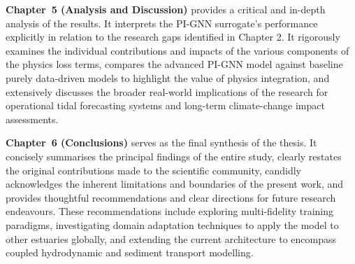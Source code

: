 \textbf{Chapter~5 (Analysis and Discussion)} provides a critical and in-depth analysis of the results. It interprets the
PI-GNN surrogate's performance explicitly in relation to the research gaps identified in Chapter 2. It rigorously
examines the individual contributions and impacts of the various components of the physics loss terms, compares the advanced PI-GNN model
against baseline purely data-driven models to highlight the value of physics integration, and extensively discusses the broader real-world implications of the research for operational
tidal forecasting systems and long-term climate-change impact assessments.

\textbf{Chapter~6 (Conclusions)} serves as the final synthesis of the thesis. It concisely summarises the principal findings of
the entire study, clearly restates the original contributions made to the scientific community, candidly acknowledges the
inherent limitations and boundaries of the present work, and provides thoughtful recommendations and clear directions for future research endeavours. These recommendations include exploring multi-fidelity training paradigms, investigating domain adaptation techniques to apply the model to other estuaries globally,
and extending the current architecture to encompass coupled hydrodynamic and sediment transport modelling.
